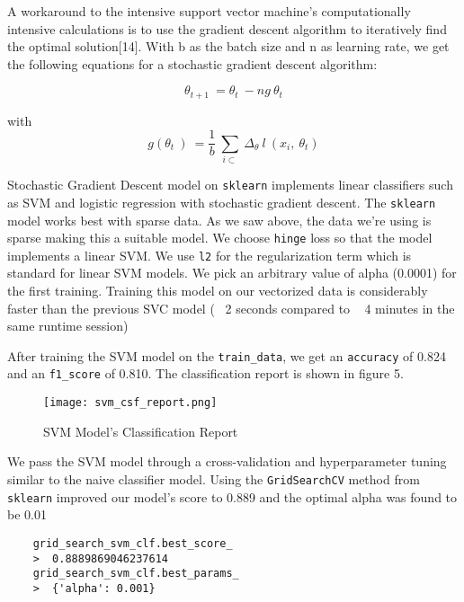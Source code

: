 \documentclass{article}
\begin{document}
A workaround to the intensive support vector machine's computationally intensive calculations is to use the gradient descent algorithm to iteratively find the optimal solution[14]. With  b  as the batch size and  n  as learning rate, we get the following equations for a stochastic gradient descent algorithm:

\begin{equation}
    {\theta}_{t+1} \: = {\theta}_{t}\: - ng\:{\theta}_{t}
\end{equation}

with 
\begin{equation}
g({\theta}_{t}\:) \: = \frac{1}{b}\: \sum_{i\subset}\: \Delta_{\theta} \: l\: (x_{i},\:\theta_{t})
\end{equation} 

Stochastic Gradient Descent model on \texttt{sklearn} implements linear classifiers such as SVM and logistic regression with stochastic gradient descent. The \texttt{sklearn} model works best with sparse data. As we saw above, the data we're using is sparse making this a suitable model. We choose \texttt{hinge} loss so that the model implements a linear SVM. We use \texttt{l2} for the regularization term which is standard for linear SVM models. We pick an arbitrary value of alpha (0.0001) for the first training. Training this model on our vectorized data is considerably faster than the previous SVC model ( ~2 seconds compared to ~ 4 minutes in the same runtime session) 

After training the SVM model on the \texttt{train\_data}, we get an \texttt{accuracy} of 0.824 and an \texttt{f1\_score} of 0.810. The classification report is shown in figure 5.

\begin{figure}[htp]
    \centering
    \texttt{[image: svm\_csf\_report.png]}
    \caption{SVM Model's Classification Report}
    \label{fig:galaxy}
\end{figure} 

We pass the SVM model through a cross-validation and hyperparameter tuning similar to the naive classifier model. Using the \texttt{GridSearchCV} method from \texttt{sklearn}  improved our model's score to 0.889 and the optimal alpha was found to be 0.01 

\begin{lstlisting}
    grid_search_svm_clf.best_score_
    >  0.8889869046237614
    grid_search_svm_clf.best_params_
    >  {'alpha': 0.001}
\end{lstlisting} 
\end{document}
